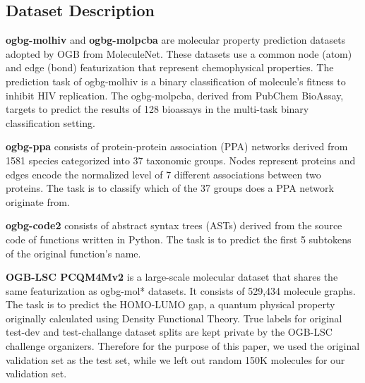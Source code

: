 \documentclass[nohyperref]{article}
\theoremstyle{plain}
\theoremstyle{definition}
\theoremstyle{remark}
\begin{document}
\subsection{Dataset Description}
\textbf{ogbg-molhiv} and \textbf{ogbg-molpcba} \citep{hu2020open} are molecular property prediction datasets
adopted by OGB from MoleculeNet. These datasets use a common node (atom) and edge (bond)
featurization that represent chemophysical properties. 
The prediction task of ogbg-molhiv is a binary
classification of molecule's fitness to inhibit HIV replication. The ogbg-molpcba, derived from
PubChem BioAssay, targets to predict the results of 128 bioassays in the multi-task binary classification
setting.

\textbf{ogbg-ppa} \citep{wu2021representing} consists of protein-protein association (PPA) networks derived from
1581 species categorized into 37 taxonomic groups. Nodes represent proteins and edges encode the
normalized level of 7 different associations between two proteins. The task is to classify which of the
37 groups does a PPA network originate from.

\textbf{ogbg-code2} \citep{wu2021representing} consists of abstract syntax trees (ASTs) derived from the source
code of functions written in Python. The task is to predict the first 5 subtokens of the original
function's name. 

\textbf{OGB-LSC PCQM4Mv2} \citep{hu2021ogb} is a large-scale molecular dataset that shares the
same featurization as ogbg-mol* datasets. It consists of 529,434 molecule graphs. The task is to predict the HOMO-LUMO gap, a quantum physical property originally calculated using Density Functional Theory. True labels for original
test-dev and test-challange dataset splits are kept private by the OGB-LSC challenge organizers.
Therefore for the purpose of this paper, we used the original validation set as the test set, while we
left out random 150K molecules for our validation set.
\end{document}
